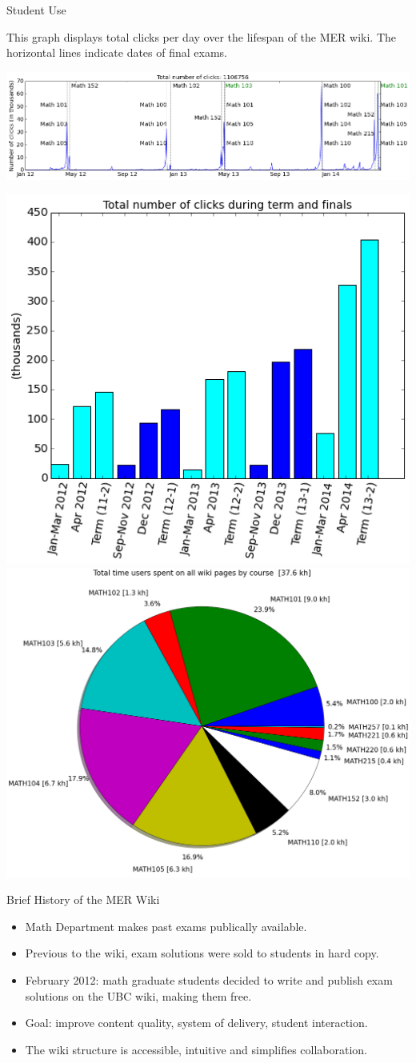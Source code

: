 \documentclass[final]{beamer}
\newlength{\onecolwid}
\begin{document}
\begin{frame}[t]
\begin{columns}[t]
\begin{column}{\onecolwid}
\begin{block}{Student Use}

This graph displays total clicks per day over the lifespan of the MER wiki. The horizontal lines indicate dates of final exams.

\smallskip

\includegraphics[width=\textwidth]{spikes.png}

\smallskip

\begin{center}
\hfill \includegraphics[width=.4\textwidth]{total_number_of_clicks_term_finals_bar.png} \hfill \includegraphics[width=.4\textwidth]{total_time_per_course.png} \hfill \mbox{}
\end{center}


\end{block}

\begin{block}{Brief History of the MER Wiki}
\begin{itemize}
      \item Math Department makes past exams publically available.
      \item Previous to the wiki, exam solutions were sold to students in hard copy.
      \item February 2012: math graduate students decided to write and publish exam solutions on the UBC wiki, making them free.
      \item Goal: improve content quality, system of delivery, student interaction.
	  \item The wiki structure is accessible, intuitive and simplifies collaboration.
\end{itemize}
\end{block}


\end{column}
\end{columns}
\end{frame}
\end{document}
